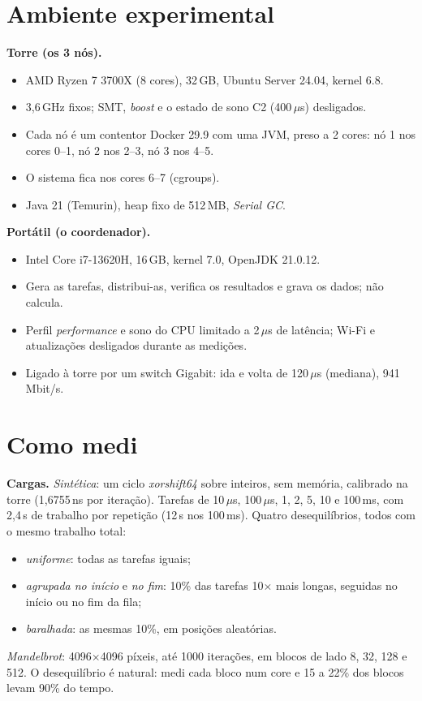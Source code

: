 \documentclass[sigplan]{acmart}
\begin{document}
\section{Ambiente experimental}

\noindent\textbf{Torre (os 3 nós).}
\begin{itemize}
  \item AMD Ryzen 7 3700X (8 cores), 32\,GB, Ubuntu Server 24.04, kernel 6.8.
  \item 3,6\,GHz fixos; SMT, \emph{boost} e o estado de sono C2 (400\,$\mu$s) desligados.
  \item Cada nó é um contentor Docker 29.9 com uma JVM, preso a 2 cores: nó 1 nos cores
        0--1, nó 2 nos 2--3, nó 3 nos 4--5.
  \item O sistema fica nos cores 6--7 (cgroups).
  \item Java 21 (Temurin), heap fixo de 512\,MB, \emph{Serial GC}.
\end{itemize}

\smallskip
\noindent\textbf{Portátil (o coordenador).}
\begin{itemize}
  \item Intel Core i7-13620H, 16\,GB, kernel 7.0, OpenJDK 21.0.12.
  \item Gera as tarefas, distribui-as, verifica os resultados e grava os dados; não calcula.
  \item Perfil \emph{performance} e sono do CPU limitado a 2\,$\mu$s de latência; Wi-Fi e
        atualizações desligados durante as medições.
  \item Ligado à torre por um switch Gigabit: ida e volta de 120\,$\mu$s (mediana), 941\,Mbit/s.
\end{itemize}

\section{Como medi}

\noindent\textbf{Cargas.} \emph{Sintética}: um ciclo \emph{xorshift64} sobre inteiros, sem
memória, calibrado na torre (1,6755\,ns por iteração). Tarefas de 10\,$\mu$s, 100\,$\mu$s,
1, 2, 5, 10 e 100\,ms, com 2,4\,s de trabalho por repetição (12\,s nos 100\,ms). Quatro
desequilíbrios, todos com o mesmo trabalho total:
\begin{itemize}
  \item \emph{uniforme}: todas as tarefas iguais;
  \item \emph{agrupada no início} e \emph{no fim}: 10\% das tarefas 10$\times$ mais longas,
        seguidas no início ou no fim da fila;
  \item \emph{baralhada}: as mesmas 10\%, em posições aleatórias.
\end{itemize}
\emph{Mandelbrot}: 4096$\times$4096 píxeis, até 1000 iterações, em blocos de lado 8, 32,
128 e 512. O desequilíbrio é natural: medi cada bloco num core e 15 a 22\% dos blocos levam
90\% do tempo.
\end{document}
